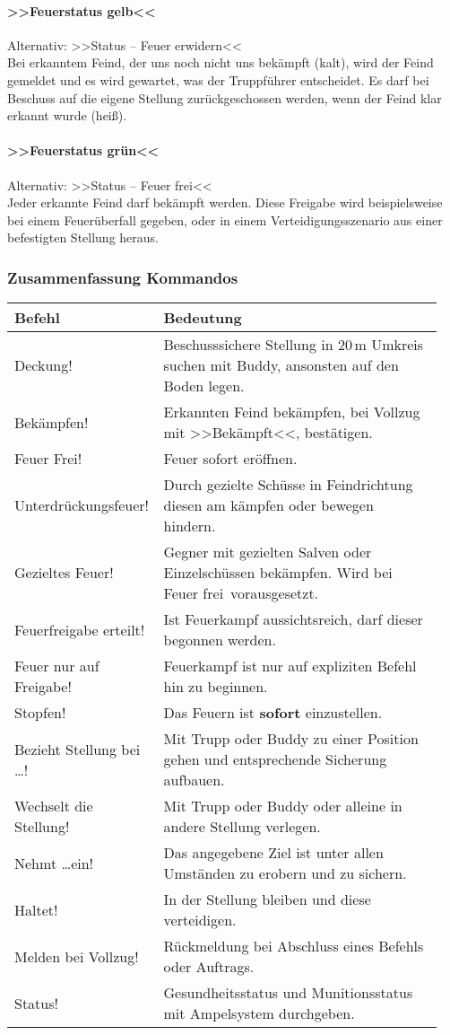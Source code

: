 \paragraph*{>>Feuerstatus gelb<<}
	Alternativ: >>Status -- Feuer erwidern<<\hfil\\
	Bei erkanntem Feind, der uns noch nicht uns bekämpft (kalt), wird der Feind gemeldet und es wird gewartet, was der Truppführer entscheidet. Es darf bei Beschuss auf die eigene Stellung zurückgeschossen werden, wenn der Feind klar erkannt wurde (heiß).

\paragraph*{>>Feuerstatus grün<<}
	Alternativ: >>Status -- Feuer frei<<\hfil\\
	Jeder erkannte Feind darf bekämpft werden. Diese Freigabe wird beispielsweise bei einem Feuerüberfall gegeben, oder in einem Verteidigungsszenario aus einer befestigten Stellung heraus.

\subsubsection{Zusammenfassung Kommandos}
	\begin{longtable}{p{0.3\linewidth}p{0.65\linewidth}} 
		\toprule
		\textbf{Befehl} & \textbf{Bedeutung}\\
		\midrule
		Deckung! & Beschusssichere Stellung in 20\,m Umkreis suchen mit Buddy, ansonsten auf den Boden legen.\\
		Bekämpfen! & Erkannten Feind bekämpfen, bei Vollzug mit >>Bekämpft<<, bestätigen.\\
		Feuer Frei! & Feuer sofort eröffnen.\\
		Unterdrückungsfeuer! & Durch gezielte Schüsse in Feindrichtung diesen am kämpfen oder bewegen hindern.\\
		Gezieltes Feuer! & Gegner mit gezielten Salven oder Einzelschüssen bekämpfen. Wird bei \glqq Feuer frei\grqq\, vorausgesetzt.\\
		Feuerfreigabe erteilt! & Ist Feuerkampf aussichtsreich, darf dieser begonnen werden.\\
		Feuer nur auf Freigabe! & Feuerkampf ist nur auf expliziten Befehl hin zu beginnen.\\
		Stopfen! & Das Feuern ist \textbf{sofort} einzustellen.\\
		Bezieht Stellung bei \dots! & Mit Trupp oder Buddy zu einer Position gehen und entsprechende Sicherung aufbauen.\\
		Wechselt die Stellung! & Mit Trupp oder Buddy oder alleine in andere Stellung verlegen.\\
		Nehmt \dots ein! & Das angegebene Ziel ist unter allen Umständen zu erobern und zu sichern.\\
		Haltet! & In der Stellung bleiben und diese verteidigen.\\
		Melden bei Vollzug! & Rückmeldung bei Abschluss eines Befehls oder Auftrags.\\
		Status! & Gesundheitsstatus und Munitionsstatus mit Ampelsystem durchgeben.\\
		\bottomrule
	\end{longtable}
